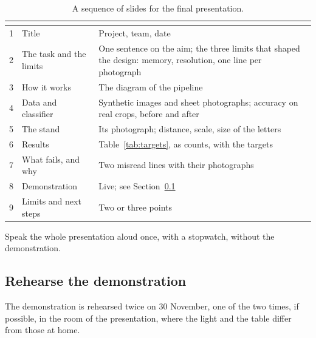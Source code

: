 \begin{table}[H]
\centering
\begin{tabular}{C{1.1cm}L{4.2cm}L{5.7cm}}
\toprule
{} &  &  \\
 & Title & Project, team, date \\
2 & The task and the limits & One sentence on the aim; the three limits that shaped the design:
  memory, resolution, one line per photograph \\
3 & How it works & The diagram of the pipeline \\
4 & Data and classifier & Synthetic images and sheet photographs; accuracy on real crops,
  before and after \\
5 & The stand & Its photograph; distance, scale, size of the letters \\
6 & Results & Table~\ref{tab:targets}, as counts, with the targets \\
7 & What fails, and why & Two misread lines with their photographs \\
8 & Demonstration & Live; see Section~\ref{sec:rehearsal} \\
9 & Limits and next steps & Two or three points \\
\bottomrule
\end{tabular}
\caption{A sequence of slides for the final presentation.}
\label{tab:slides}
\end{table}

Speak the whole presentation aloud once, with a stopwatch, without the demonstration.

\subsection{Rehearse the demonstration}
\label{sec:rehearsal}

The demonstration is rehearsed twice on 30 November, one of the two times, if possible, in the
room
of the presentation, where the light and the table differ from those at home.

